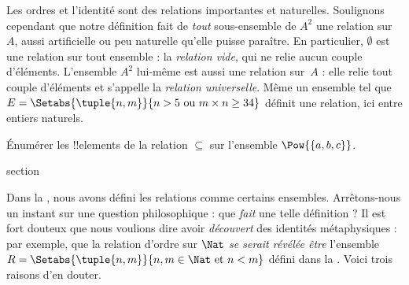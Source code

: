 \documentclass[11pt,a4paper,openany]{memoir}
\begin{document}
\begin{explain}
Les ordres et l'identité sont des relations importantes
et naturelles. Soulignons cependant que notre définition fait
de \emph{tout} sous-ensemble de $A^{2}$ une relation sur~$A$,
aussi artificielle ou peu naturelle qu'elle puisse paraître.
En particulier, $\emptyset$ est une relation sur tout ensemble :
la \emph{relation vide}, qui ne relie aucun couple d'éléments.
L'ensemble $A^{2}$ lui-même est aussi une relation sur~$A$ :
elle relie tout couple d'éléments et s'appelle la
\emph{relation universelle}. Même un ensemble tel que
$E=\Setabs{\tuple{n, m}}{n>5 \text{ ou } m \times n \ge 34}$
définit une relation, ici entre entiers naturels.
\end{explain}

\begin{prob}
  Énumérer les !!{element}s de la relation $\subseteq$
  sur l'ensemble $\Pow{\{a, b, c\}}$.
\end{prob}


\endgroup



\begingroup
\expandafter\def\csname ol@sectioncs\endcsname{section}
\def\olfilename{reflections}



Dans la , nous avons défini les relations comme
certains ensembles. Arrêtons-nous un instant sur une question
philosophique : que \emph{fait} une telle définition ?
Il est fort douteux que nous voulions dire avoir
\emph{découvert} des identités métaphysiques : par exemple,
que la relation d'ordre sur $\Nat$ \emph{se serait révélée être}
l'ensemble $R= \Setabs{\tuple{n,m}}{n, m \in \Nat\text{ et }
n < m}$ défini dans la .
Voici trois raisons d'en douter.
\end{document}
